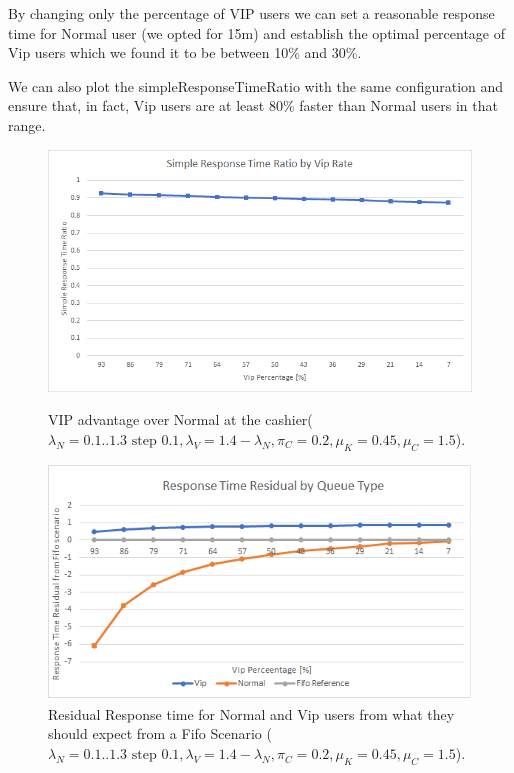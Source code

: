 By changing only the percentage of VIP users we can set a reasonable response time for Normal user (we opted for 15m) and establish the optimal percentage of Vip users which we found it to be between 10\% and 30\%.

We can also plot the simpleResponseTimeRatio with the same configuration and ensure that, in fact, Vip users are at least 80\% faster than Normal users in that range.

\begin{figure}[h!]
  \centering
  \begin{minipage}{0.48\textwidth}
    \includegraphics[width=\textwidth]{figs/simpleResponseTimeRatio.png}
    \caption{VIP advantage over Normal at the cashier($\lambda_N={{0.1..1.3 \text{ step } 0.1}},\lambda_V=1.4-\lambda_N,\pi_C=0.2, \mu_K=0.45, \mu_C=1.5$).}
    \label{}
  \end{minipage}\hspace{0.03\textwidth}
  \begin{minipage}{0.48\textwidth}
    \includegraphics[width=\textwidth]{figs/responseTimeResidualCashier.png}
    \caption{Residual Response time for Normal and Vip users from what they should expect from a Fifo Scenario ($\lambda_N={{0.1..1.3 \text{ step } 0.1}},\lambda_V=1.4-\lambda_N,\pi_C=0.2, \mu_K=0.45, \mu_C=1.5$).}
    \label{fig:residual-cashier}
  \end{minipage}
\end{figure}

